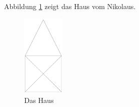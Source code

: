 \documentclass[varwidth]{standalone}
\begin{document}
Abbildung \ref{fig:house} zeigt das Haus vom Nikolaus. 
\begin{figure}[htb]
	\centering
	\includegraphics[width=2cm]{house/house.png}
	\caption{Das Haus}
	\label{fig:house}
\end{figure}
\end{document}
